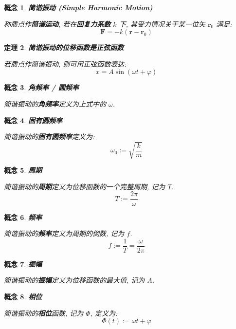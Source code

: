\documentclass[UTF8]{ctexart}
\newcommand{\<}{\langle}
\renewcommand{\>}{\rangle}                              %
\newenvironment{dfn_box}{
    \begin{tcolorbox}[enhanced, colback=dfn_green2, boxrule=0pt, frame hidden,
        borderline west={0.7mm}{0.1mm}{dfn_green1},breakable]
    }
    {\end{tcolorbox}}
\newenvironment{thm_box}{
    \begin{tcolorbox}[enhanced, colback=thm_blue2, boxrule=0pt, frame hidden,
        borderline west={0.7mm}{0.1mm}{thm_blue1},breakable]
    }
    {\end{tcolorbox}}
\theoremstyle{MyStyle} %
\newtheorem{definition}{概念}[subsection]
\newenvironment{cpt}{\begin{dfn_box}\begin{definition}}{\end{definition}\end{dfn_box}}
\newtheorem{theorem}[definition]{定理}
\newenvironment{thm}{\begin{thm_box}\begin{theorem}}{\end{theorem}\end{thm_box}}
\begin{document}
            \begin{cpt}
                \textbf{简谐振动 (Simple Harmonic Motion)}

                称质点作\textbf{简谐运动}, 若在\textbf{回复力系数} \(k\) 下, 其受力情况关于某一位矢 \(\bm{r}_0\) 满足: 
                \[\bm{F}=-k(\bm{r}-\bm{r}_0)\]
            \end{cpt}
            
            \begin{thm}
                \textbf{简谐振动的位移函数是正弦函数}

                若质点作简谐振动, 则可用正弦函数表达: 
                \[x=A\sin(\omega t+\varphi)\]
            \end{thm}
            
            \begin{cpt}
                \textbf{角频率 / 圆频率}

                简谐振动的\textbf{角频率}定义为上式中的 \(\omega\). 
            \end{cpt}
            
            \begin{cpt}
                \textbf{固有圆频率}

                简谐振动的\textbf{固有圆频率}定义为: 
                \[\omega_0:=\sqrt{\frac{k}{m}}\]
            \end{cpt}
            
            \begin{cpt}
                \textbf{周期}

                简谐振动的\textbf{周期}定义为位移函数的一个完整周期, 记为 \(T\). 
                \[T:=\frac{2\pi}{\omega}\]
            \end{cpt}
            
            \begin{cpt}
                \textbf{频率}

                简谐振动的\textbf{频率}定义为周期的倒数, 记为 \(f\). 
                \[f:=\frac{1}{T}=\frac{\omega}{2\pi}\]
            \end{cpt}
            
            \begin{cpt}
                \textbf{振幅}

                简谐振动的\textbf{振幅}定义为位移函数的最大值, 记为 \(A\). 
            \end{cpt}
            
            \begin{cpt}
                \textbf{相位}

                简谐振动的\textbf{相位}函数, 记为 \(\Phi\), 定义为: 
                \[\Phi(t):=\omega t+\varphi\]
            \end{cpt}
            
\end{document}
